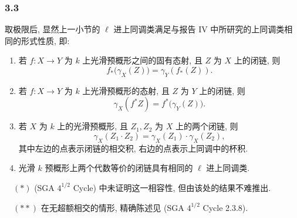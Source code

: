 \subsubsection*{3.3}
取极限后, 显然上一小节的 \(\ell\) 进上同调类满足与报告 IV 中所研究的上同调类相同的形式性质, 即:

\begin{enumerate}[label=(\roman*)]
\item 若 \(f:X\to Y\) 为 \(k\) 上光滑预概形之间的固有态射, 且 \(Z\) 为 \(X\) 上的闭链, 则
\[
f_*\bigl(\gamma_X(Z)\bigr)=\gamma_Y(f_*(Z)).
\tag{*}
\]

\item 若 \(f:X\to Y\) 为 \(k\) 上光滑预概形的态射, 且 \(Z\) 为 \(Y\) 上的闭链, 则
\[
\gamma_X(f^*Z)=f^*\bigl(\gamma_Y(Z)\bigr).
\tag{**}
\]

\item 若 \(X\) 为 \(k\) 上的光滑预概形, 且 \(Z_1,Z_2\) 为 \(X\) 上的两个闭链, 则
\[
\gamma_X(Z_1\cdot Z_2)=\gamma_X(Z_1)\cdot \gamma_X(Z_2),
\tag{**}
\]
其中左边的点表示闭链的相交积, 右边的点表示上同调中的杯积.

\item 光滑 \(k\) 预概形上两个代数等价的闭链具有相同的 \(\ell\) 进上同调类.
\end{enumerate}

\begin{flushleft}
\(\quad (*)\) (SGA \(4^{1/2}\) Cycle) 中未证明这一相容性, 但由该处的结果不难推出.

\(\quad (**)\) 在无超额相交的情形, 精确陈述见 (SGA \(4^{1/2}\) Cycle 2.3.8).
\end{flushleft}

